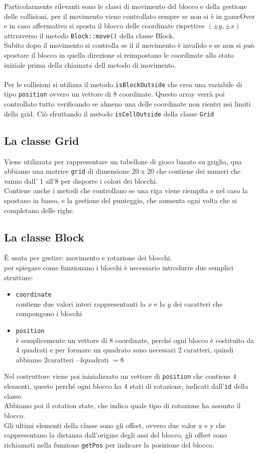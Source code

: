 \documentclass[a4paper]{article}
\begin{document}
Particolarmente rilevanti sono le classi di movimento del blocco e della gestione delle collisioni,
per il movimento viene controllato sempre se non si è in gameOver e in caso affermativo si sposta il blocco delle coordinate rispettive $(\pm y, \pm x)$ attrraverso il metodo \verb!Block::move()! della classe Block. \\
Subito dopo il movimento si controlla se il il movimento è invalido e se non si può spostare il blocco in quella direzione si reimpostano le coordinate allo stato iniziale prima della chiamata dell metodo di movimento.
\\ \\
Per le collisioni si utilizza il metodo \verb!isBlockOutside! che crea una variabile di tipo \verb!position! ovvero un vettore di 8 coordinate.
Questo array verrà poi controllato tutto verificando se almeno una delle coordinate non rientri nei limiti della grid. Ciò sfruttando il metodo \verb!isCellOutside! della classe \verb!Grid!

\subsection{La classe Grid}
Viene utilizzata per rappresentare un tabellone di gioco basato su griglia, qua abbiamo una matrice \verb!grid! di dimensione 20 x 20 che contiene dei numeri che vanno dall' 1 all'8 per disporre i colori dei blocchi. \\
Contiene anche i metodi che controllano se una riga viene riempita e nel caso la spostano in basso, e la gestione del punteggio, che aumenta ogni volta che si completano delle righe.

\subsection{La classe Block}
È usata per gestire: movimento e rotazione dei blocchi. \\
per spiegare come funzionano i blocchi è necessario introdurre due semplici strutture:
\begin{itemize}
    \item \verb|coordinate| \\ contiene due valori interi rappresentanti la $x$ e la $y$ dei caratteri che compongono i blocchi
    \item \verb|position| \\ è semplicemente un vettore di 8 coordinate, perché ogni blocco è costituito da 4 quadrati e per formare un quadrato sono necessari 2 caratteri, quindi abbiamo $2$caratteri $\cdot \ 4$quadrati $=8$
\end{itemize}
Nel costruttore viene poi inizializzato un vettore di \verb|position| che contiene 4 elementi, questo perché ogni blocco ha 4 stati di rotazione, indicati dall'\verb|id| della classe. \\ 
Abbiamo poi il rotation state, che indica quale tipo di rotazione ha assunto il blocco.\\
Gli ultimi elementi della classe sono gli offset, ovvero due valor x e y che rappresentano la distanza dall'origine degli assi del blocco, gli offset sono richiamati nella funzione \verb|getPos| per indicare la posizione del blocco.
\end{document}
